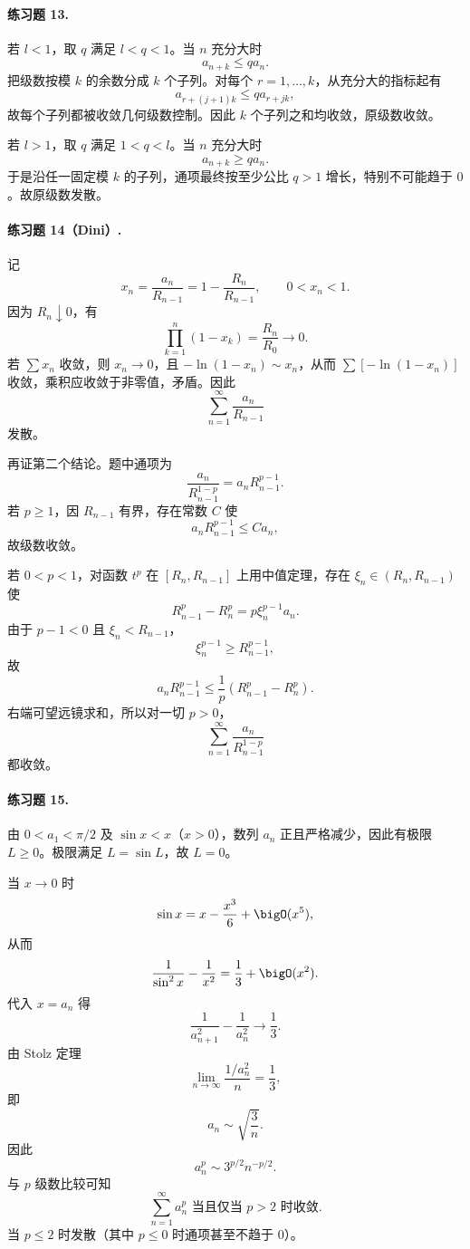\paragraph{练习题 13.}
\begin{xsolution}
若 $l<1$，取 $q$ 满足 $l<q<1$。当 $n$ 充分大时
\[
 a_{n+k}\leq q a_n.
\]
把级数按模 $k$ 的余数分成 $k$ 个子列。对每个 $r=1,\ldots,k$，从充分大的指标起有
\[
 a_{r+(j+1)k}\leq q a_{r+jk},
\]
故每个子列都被收敛几何级数控制。因此 $k$ 个子列之和均收敛，原级数收敛。

若 $l>1$，取 $q$ 满足 $1<q<l$。当 $n$ 充分大时
\[
 a_{n+k}\geq q a_n.
\]
于是沿任一固定模 $k$ 的子列，通项最终按至少公比 $q>1$ 增长，特别不可能趋于 $0$。故原级数发散。
\end{xsolution}

\paragraph{练习题 14（Dini）.}
\begin{xsolution}
记
\[
 x_n=\frac{a_n}{R_{n-1}}=1-\frac{R_n}{R_{n-1}},
 \qquad 0<x_n<1.
\]
因为 $R_n\downarrow0$，有
\[
 \prod_{k=1}^{n}(1-x_k)=\frac{R_n}{R_0}\longrightarrow0.
\]
若 $\sum x_n$ 收敛，则 $x_n\to0$，且 $-\ln(1-x_n)\sim x_n$，从而 $\sum[-\ln(1-x_n)]$ 收敛，乘积应收敛于非零值，矛盾。因此
\[
 \sum_{n=1}^{\infty}\frac{a_n}{R_{n-1}}
\]
发散。

再证第二个结论。题中通项为
\[
 \frac{a_n}{R_{n-1}^{1-p}}=a_nR_{n-1}^{p-1}.
\]
若 $p\geq1$，因 $R_{n-1}$ 有界，存在常数 $C$ 使
\[
 a_nR_{n-1}^{p-1}\leq Ca_n,
\]
故级数收敛。

若 $0<p<1$，对函数 $t^p$ 在 $[R_n,R_{n-1}]$ 上用中值定理，存在 $\xi_n\in(R_n,R_{n-1})$ 使
\[
 R_{n-1}^p-R_n^p=p\xi_n^{p-1}a_n.
\]
由于 $p-1<0$ 且 $\xi_n<R_{n-1}$，
\[
 \xi_n^{p-1}\geq R_{n-1}^{p-1},
\]
故
\[
 a_nR_{n-1}^{p-1}
 \leq\frac1p(R_{n-1}^p-R_n^p).
\]
右端可望远镜求和，所以对一切 $p>0$，
\[
 \sum_{n=1}^{\infty}\frac{a_n}{R_{n-1}^{1-p}}
\]
都收敛。
\end{xsolution}

\paragraph{练习题 15.}
\begin{xsolution}
由 $0<a_1<\pi/2$ 及 $\sin x<x$（$x>0$），数列 $a_n$ 正且严格减少，因此有极限 $L\geq0$。极限满足 $L=\sin L$，故 $L=0$。

当 $x\to0$ 时
\[
 \sin x=x-\frac{x^3}{6}+\bigO(x^5),
\]
从而
\[
 \frac1{\sin^2x}-\frac1{x^2}=\frac13+\bigO(x^2).
\]
代入 $x=a_n$ 得
\[
 \frac1{a_{n+1}^2}-\frac1{a_n^2}\longrightarrow\frac13.
\]
由 Stolz 定理
\[
 \lim_{n\to\infty}\frac{1/a_n^2}{n}=\frac13,
\]
即
\[
 a_n\sim\sqrt{\frac3n}.
\]
因此
\[
 a_n^p\sim3^{p/2}n^{-p/2}.
\]
与 $p$ 级数比较可知
\[
 \boxed{\sum_{n=1}^{\infty}a_n^p\text{ 当且仅当 }p>2\text{ 时收敛}.}
\]
当 $p\leq2$ 时发散（其中 $p\leq0$ 时通项甚至不趋于 $0$）。
\end{xsolution}


